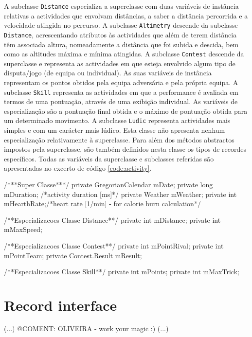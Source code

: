 \documentclass[a4paper,10pt]{report}
\begin{document}
A subclasse \verb!Distance! especializa a superclasse com duas variáveis de instância relativas a actividades que envolvam distâncias, a saber a 
distância percorrida e a velocidade atingida no percurso.
A subclasse \verb!Altimetry! descende da subclasse \verb!Distance!, acrescentando atributos às actividades que além de terem distância têm associada altura, 
nomeadamente a distância que foi subida e descida, bem como as altitudes máxima e mínima atingidas.
A subclasse \verb!Contest! descende da superclasse e representa as actividades em que esteja envolvido algum tipo de disputa/jogo (de equipa ou individual).
As suas variáveis de instância representam os pontos obtidos pela equipa adversária e pela própria equipa.
A subclasse \verb!Skill! representa as actividades em que a performance é avaliada em termos de uma pontuação, através de uma exibição individual.
As variáveis de especialização são a pontuação final obtida e o máximo de pontuação obtida para um determinado movimento.
A subclasse \verb!Ludic! representa actividades mais simples e com um carácter mais lúdico. Esta classe não apresenta nenhum especialização relativamente à 
superclasse. Para além dos métodos abstractos impostos pela superclasse, são também definidos nesta classe os tipos de recordes específicos.
Todas as variáveis da superclasse e subclasses referidas são apresentadas no excerto de código \ref{code:activity}.

\begin{code}[caption=Variáveis de instância da superclasse Activity e subclasses respectivas (src/model/activity)., label=code:activity]
/***Super Classe***/
private GregorianCalendar mDate;
private long mDuration; /*activity duration [ms]*/
private Weather mWeather;
private int mHearthRate;/*heart rate [1/min] - for calorie burn calculation*/

/**Especializacoes Classe Distance**/
private int mDistance;
private int mMaxSpeed;

/**Especializacoes Classe Contest**/
private int mPointRival;
private int mPointTeam;
private Contest.Result mResult;

/**Especializacoes Classe Skill**/
private int mPoints;
private int mMaxTrick;
\end{code}

\section{Record interface}
\label{sec:record}
(...)
@COMENT: OLIVEIRA - work your magic :)
(...)
\end{document}
